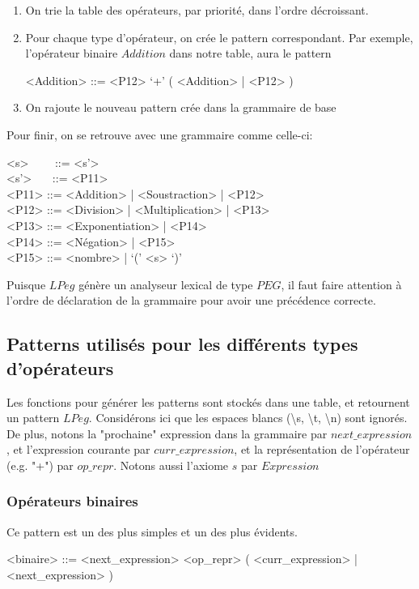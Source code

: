 \documentclass{article}
\begin{document}
\begin{enumerate}
	\item On trie la table des opérateurs, par priorité, dans l'ordre décroissant.
	\item Pour chaque type d'opérateur, on crée le pattern correspondant. Par exemple, l'opérateur binaire $Addition$ dans notre table, aura le pattern
	\begin{grammar}
		<Addition> ::= <P12> `+' ( <Addition> | <P12> )
	\end{grammar}
	\item On rajoute le nouveau pattern crée dans la grammaire de base
\end{enumerate}
Pour finir, on se retrouve avec une grammaire comme celle-ci:
\begin{grammar}
<s> \ \ \ \ ::= <s'>\\
<s'> \ \ \ ::= <P11>\\
<P11> ::= <Addition> | <Soustraction> | <P12>\\
<P12> ::= <Division> | <Multiplication> | <P13>\\
<P13> ::= <Exponentiation> | <P14>\\
<P14> ::= <Négation> | <P15>\\
<P15> ::= <nombre> | `(' <s> `)'
\end{grammar}
Puisque $LPeg$ génère un analyseur lexical de type $PEG$, il faut faire attention à l'ordre de déclaration de la grammaire pour avoir une précédence correcte.

\subsection{Patterns utilisés pour les différents types d'opérateurs}
Les fonctions pour générer les patterns sont stockés dans une table, et retournent un pattern $LPeg$. Considérons ici que les espaces blancs (\textbackslash s, \textbackslash t, \textbackslash n) sont ignorés. De plus, notons la "prochaine" expression dans la grammaire par $next\_expression$, et l'expression courante par $curr\_expression$, et la représentation de l'opérateur (e.g. "+") par $op\_repr$. Notons aussi l'axiome $s$ par $Expression$
\subsubsection{Opérateurs binaires}
Ce pattern est un des plus simples et un des plus évidents.
\begin{grammar}
	<binaire> ::= <next\_expression> <op\_repr> ( <curr\_expression> | <next\_expression> )
\end{grammar}
\end{document}
